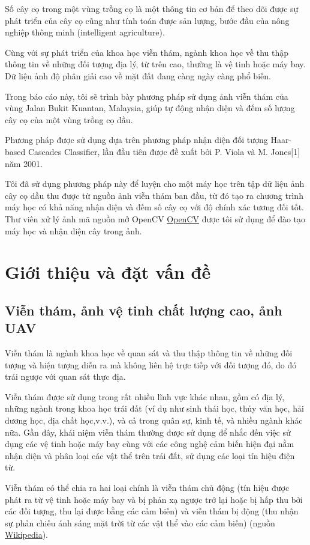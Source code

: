 \documentclass[14pt, oneside, a4paper, openany]{scrartcl}
\begin{document}
Số cây cọ trong một vùng trồng cọ là một thông tin cơ bản để theo dõi được sự phát triển của cây cọ cũng như tính toán được sản lượng, bước đầu của nông nghiệp thông minh (intelligent agriculture).

Cùng với sự phát triển của khoa học viễn thám, ngành khoa học về thu thập thông tin về những đối tượng địa lý, từ trên cao, thường là vệ tinh hoặc máy bay. Dữ liệu ảnh độ phân giải cao về mặt đất đang càng ngày càng phổ biến.

Trong báo cáo này, tôi sẽ trình bày phương pháp sử dụng ảnh viễn thám của vùng Jalan Bukit Kuantan, Malaysia, giúp tự động nhận diện và đếm số lượng cây cọ của một vùng trồng cọ dầu.

Phương pháp được sử dụng dựa trên phương pháp nhận diện đối tượng Haar-based Cascades Classifier, lần đầu tiên được đề xuất bởi P. Viola và M. Jones[1] năm 2001.

Tôi đã sử dụng phương pháp này để luyện cho một máy học trên tập dữ liệu ảnh cây cọ dầu thu được từ nguồn ảnh viễn thám ban đầu, từ đó tạo ra chương trình máy học có khả năng nhận diện và đếm số cây cọ với độ chính xác tương đối tốt. Thư viên xử lý ảnh mã nguồn mở OpenCV \href{http://opencv.org}{OpenCV} được tôi sử dụng để đào tạo máy học và nhận diện cây trong ảnh.
\newpage
\section{Giới thiệu và đặt vấn đề}
\subsection{Viễn thám, ảnh vệ tinh chất lượng cao, ảnh UAV}
Viễn thám là ngành khoa học về quan sát và thu thập thông tin về những đối tượng và hiện tượng diễn ra mà không liên hệ trực tiếp với đối tượng đó, do đó trái ngược với quan sát thực địa.

Viễn thám được sử dụng trong rất nhiều lĩnh vực khác nhau, gồm có địa lý, những ngành trong khoa học trái đất (ví dụ như sinh thái học, thủy văn học, hải dương học, địa chất học,v.v.), và cả trong quân sự, kinh tế, và nhiều ngành khác nữa.
Gần đây, khái niệm viễn thám thường được sử dụng để nhắc đến việc sử dụng các vệ tinh hoặc máy bay cùng với các công nghệ cảm biến hiện đại nằm nhận diện và phân loại các vật thể trên trái đất, sử dụng các loại tín hiệu điện từ.

Viễn thám có thể chia ra hai loại chính là viễn thám chủ động (tín hiệu được phát ra từ vệ tinh hoặc máy bay và bị phản xạ ngược trở lại hoặc bị hấp thu bởi các đối tượng, thu lại được bằng các cảm biến) và viễn thám bị động (thu nhận sự phản chiếu ánh sáng mặt trời từ các vật thể vào các cảm biến) (nguồn \href{https://en.wikipedia.org/wiki/Remote_sensing}{Wikipedia}).
\end{document}
